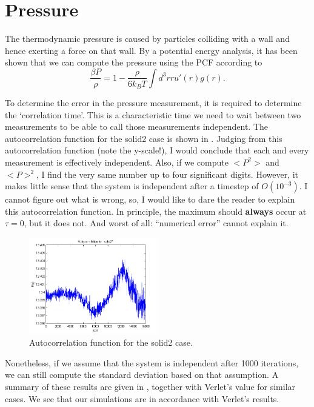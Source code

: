 \section{Pressure}
The thermodynamic pressure is caused by particles colliding with a wall and
hence exerting a force on that wall. By a potential energy analysis, it has been
shown that we can compute the pressure using the PCF according
to \cite{ravndal:statPhys}
\begin{equation}
	\frac{\beta P}{\rho} = 1 - \frac{\rho}{6k_B T} \int d^3r r u'(r) g(r).
\end{equation}

To determine the error in the pressure measurement, it is required to determine
the `correlation time'. This is a characteristic time we need to wait between
two measurements to be able to call those measurements independent. The
autocorrelation function for the solid2 case is shown in
.
Judging from this autocorrelation function (note the y-scale!), I would
conclude that each and every measurement is effectively independent.
Also, if we compute $<P^2>$ and $<P>^2$, I find the very same number
up to four significant digits.
However, it makes little sense that the system is independent after a timestep
of $O(10^{-3})$. I cannot figure out what is wrong, so, I would like to dare the
reader to explain this autocorrelation function. In principle, the maximum
should \textbf{always} occur at $\tau = 0$, but it does not. And worst of all:
``numerical error'' cannot explain it.

\begin{figure}
	\centering
	\includegraphics[width=0.5\textwidth]{../Graphs/Autocorrelation_solid2.png}
	\caption{Autocorrelation function for the solid2 case.}
	\label{fig:autocorr_pressure}
\end{figure}

Nonetheless, if we assume that the system is independent after 1000 iterations,
we can still compute the standard deviation based on that assumption.
A summary of these results are given in , together with
Verlet's \cite{verlet:firstPaper} value for similar cases. We see that our
simulations are in accordance with Verlet's results.

